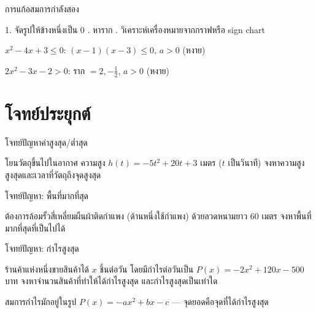 \documentclass[11pt, aspectratio=169]{beamer}
\begin{document}
\begin{frame}{การแก้อสมการกำลังสอง}
  \begin{explanation}[วิธี]
    1. จัดรูปให้ข้างหนึ่งเป็น $0$ . หาราก . วิเคราะห์เครื่องหมายจากกราฟหรือ sign chart
  \end{explanation}

  \begin{exambox}[ตัวอย่าง]
    $x^2 - 4x + 3 \leq 0$: $(x-1)(x-3) \leq 0$, $a>0$ (หงาย)

    $2x^2 - 3x - 2 > 0$: ราก $= 2, -\frac{1}{2}$, $a>0$ (หงาย)
  \end{exambox}
\end{frame}

\section{โจทย์ประยุกต์}

\begin{frame}[t]{โจทย์ปัญหาค่าสูงสุด/ตํ่าสุด}
  \begin{exambox}[โจทย์]
    โยนวัตถุขึ้นไปในอากาศ ความสูง $h(t) = -5t^2 + 20t + 3$ เมตร ($t$ เป็นวินาที)
    จงหาความสูงสูงสุดและเวลาที่วัตถุถึงจุดสูงสุด
  \end{exambox}

  \vspace{\fill}
\end{frame}

\begin{frame}[t]{โจทย์ปัญหา: พื้นที่มากที่สุด}
  \begin{exambox}[โจทย์]
    ต้องการล้อมรั้วสี่เหลี่ยมผืนผ้าติดกำแพง (ด้านหนึ่งใช้กำแพง) ด้วยลวดหนามยาว 60 เมตร
    จงหาพื้นที่มากที่สุดที่เป็นไปได้
  \end{exambox}

  \vspace{\fill}
\end{frame}

\begin{frame}[t]{โจทย์ปัญหา: กำไรสูงสุด}
  \begin{exambox}[โจทย์]
    ร้านค้าแห่งหนึ่งขายสินค้าได้ $x$ ชิ้นต่อวัน โดยมีกำไรต่อวันเป็น
    $P(x) = -2x^2 + 120x - 500$ บาท
    จงหาจำนวนสินค้าที่ทำให้ได้กำไรสูงสุด และกำไรสูงสุดเป็นเท่าใด
  \end{exambox}

  \vspace{\fill}

  \begin{intuition}
    สมการกำไรมักอยู่ในรูป $P(x) = -ax^2 + bx - c$
    — จุดยอดคือจุดที่ได้กำไรสูงสุด
  \end{intuition}
\end{frame}
\end{document}
